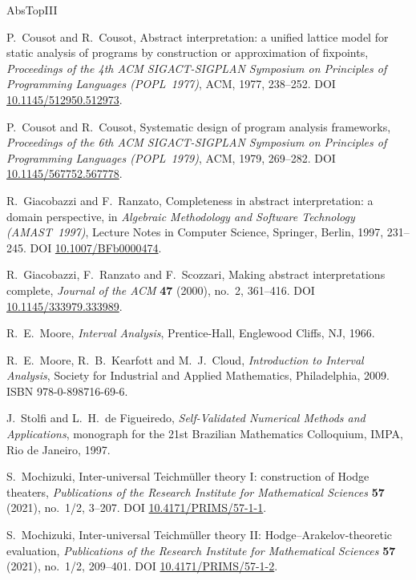 \documentclass[11pt]{article}
\theoremstyle{plain}
\theoremstyle{definition}
\theoremstyle{remark}
\begin{document}
\clearpage

\begin{thebibliography}{AbsTopIII}

 P.~Cousot and R.~Cousot, Abstract
interpretation: a unified lattice model for static analysis of
programs by construction or approximation of fixpoints,
\emph{Proceedings of the 4th ACM SIGACT-SIGPLAN Symposium on
Principles of Programming Languages (POPL~1977)}, ACM, 1977,
238--252.
DOI \href{https://doi.org/10.1145/512950.512973}{10.1145/512950.512973}.

 P.~Cousot and R.~Cousot, Systematic design of
program analysis frameworks, \emph{Proceedings of the 6th ACM
SIGACT-SIGPLAN Symposium on Principles of Programming Languages
(POPL~1979)}, ACM, 1979, 269--282.
DOI \href{https://doi.org/10.1145/567752.567778}{10.1145/567752.567778}.

 R.~Giacobazzi and F.~Ranzato, Completeness in
abstract interpretation: a domain perspective, in \emph{Algebraic
Methodology and Software Technology (AMAST~1997)}, Lecture Notes in
Computer Science, Springer, Berlin, 1997, 231--245.
DOI \href{https://doi.org/10.1007/BFb0000474}{10.1007/BFb0000474}.

 R.~Giacobazzi, F.~Ranzato and F.~Scozzari,
Making abstract interpretations complete, \emph{Journal of the ACM}
\textbf{47} (2000), no.~2, 361--416.
DOI \href{https://doi.org/10.1145/333979.333989}{10.1145/333979.333989}.

 R.~E.~Moore, \emph{Interval Analysis},
Prentice-Hall, Englewood Cliffs, NJ, 1966.

 R.~E.~Moore, R.~B.~Kearfott and
M.~J.~Cloud, \emph{Introduction to Interval Analysis}, Society for
Industrial and Applied Mathematics, Philadelphia, 2009.
ISBN 978-0-898716-69-6.

 J.~Stolfi and L.~H.~de Figueiredo,
\emph{Self-Validated Numerical Methods and Applications}, monograph
for the 21st Brazilian Mathematics Colloquium, IMPA, Rio de
Janeiro, 1997.

 S.~Mochizuki, Inter-universal Teichm\"uller
theory I: construction of Hodge theaters, \emph{Publications of the
Research Institute for Mathematical Sciences} \textbf{57} (2021),
no.~1/2, 3--207.
DOI \href{https://doi.org/10.4171/PRIMS/57-1-1}{10.4171/PRIMS/57-1-1}.

 S.~Mochizuki, Inter-universal Teichm\"uller
theory II: Hodge--Arakelov-theoretic evaluation, \emph{Publications
of the Research Institute for Mathematical Sciences} \textbf{57}
(2021), no.~1/2, 209--401.
DOI \href{https://doi.org/10.4171/PRIMS/57-1-2}{10.4171/PRIMS/57-1-2}.


\end{thebibliography}
\end{document}
